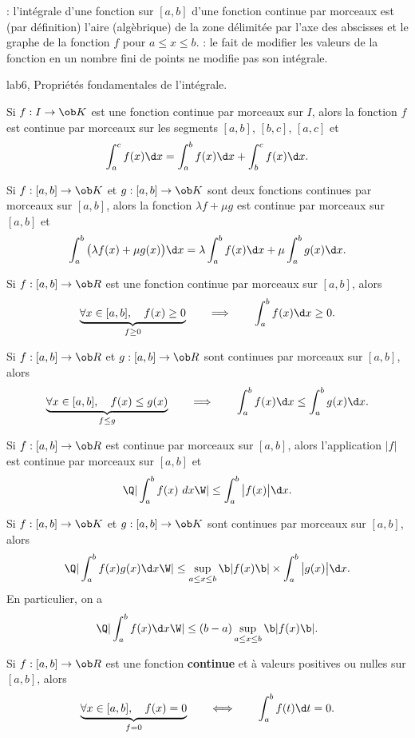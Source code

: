 \Remarque : l'intégrale d'une fonction sur $[a,b]$ d'une fonction continue par morceaux est (par définition) l'aire (algèbrique) de la zone délimitée par l'axe des abscisses et le graphe de la fonction $f$ pour $a\le x\le b$. 
\bigskip
\Remarque  : le fait de modifier les valeurs de la fonction en un nombre fini de points ne modifie pas son intégrale. 
\bigskip

\Section lab6, Propriétés fondamentales de l'intégrale. 
\bigskip

\Propriete [$I$ intervalle, $(a,b,c)\in I^3$] 
Si $f:I\to\ob K$ est une fonction continue par morceaux sur $I$, alors la fonction $f$ est continue par morceaux sur les segments $[a,b]$, $[b,c]$, $[a,c]$ et 
$$
\int_a^cf(x)\d x=\int_a^bf(x)\d x+\int_b^cf(x)\d x. 
$$

\Propriete [$(a,b)\in\ob R^2$, $(\lambda,\mu)\in\ob K^2$] 
Si $f:[a,b]\to\ob K$ et $g:[a,b]\to\ob K$ sont deux fonctions continues par morceaux sur $[a,b]$, alors la fonction $\lambda f+\mu g$ est continue par morceaux sur $[a,b]$ et 
\Equation [\bf Linéarité]
$$
\int_a^b\big(\lambda f(x)+\mu g(x)\big)\d x=\lambda \int_a^bf(x)\d x+\mu \int_a^bg(x)\d x. 
$$

\Propriete [$a\le b$] 
Si $f:[a,b]\to\ob R$ est une fonction continue par morceaux sur $[a,b]$, alors 
\Equation [\bf Positivité]
$$
\underbrace{
\forall x\in[a,b],\quad f(x)\ge0}_{f\ge0}\qquad\Longrightarrow\qquad \int_a^bf(x)\d x\ge0.
$$ 


\Propriete [$a\le b$]
Si $f:[a,b]\to\ob R$ et $g:[a,b]\to\ob R$ sont continues par morceaux sur $[a,b]$, alors
\Equation [ \bf Croissance]
$$
\underbrace{
\forall x\in[a,b],\quad f(x)\le g(x)}_{f\le g}\qquad\Longrightarrow\qquad \int_a^bf(x)\d x\le \int_a^bg(x)\d x.
$$ 

\Propriete[$a\le b$] 
Si $f:[a,b]\to\ob R$ est continue par morceaux sur $[a,b]$, alors l'application $|f|$ est continue par morceaux sur $[a,b]$ et 
$$
\Q|\int_a^bf(x)\ dx\W|\le \int_a^b\big|f(x)\big|\d x.
$$ 

\Propriete [$a\le b$] 
Si $f:[a,b]\to\ob K$ et $g:[a,b]\to\ob K$ sont continues par morceaux sur $[a,b]$, alors 
$$
\Q|\int_a^bf(x)g(x)\d x\W|\le \sup_{a\le x\le b}\b|f(x)\b|\times\int_a^b\big|g(x)\big|\d x.
$$
En particulier, on a 
$$
\Q|\int_a^bf(x)\d x\W|\le (b-a)\sup_{a\le x\le b}\b|f(x)\b|.
$$



\Theoreme [$a<b$] 
Si $f:[a,b]\to\ob R$ est une fonction 
{\bf continue} et à valeurs positives ou nulles sur $[a,b]$, alors 
$$
\underbrace{\forall x\in[a,b],\quad f(x)=0}_{f=0}\qquad\Longleftrightarrow \qquad\int_a^bf(t)\d t=0.
$$

